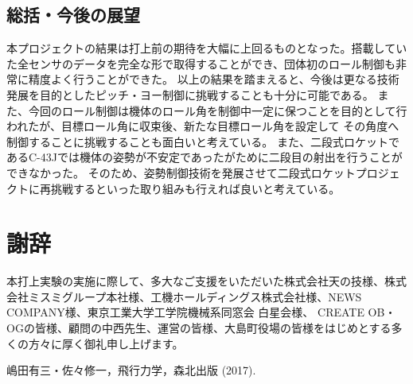 \documentclass[a4paper,11pt,uplatex]{jsarticle}
\begin{document}
\subsection{総括・今後の展望}
本プロジェクトの結果は打上前の期待を大幅に上回るものとなった。搭載していた全センサのデータを完全な形で取得することができ、団体初のロール制御も非常に精度よく行うことができた。
以上の結果を踏まえると、今後は更なる技術発展を目的としたピッチ・ヨー制御に挑戦することも十分に可能である。
また、今回のロール制御は機体のロール角を制御中一定に保つことを目的として行われたが、目標ロール角に収束後、新たな目標ロール角を設定して
その角度へ制御することに挑戦することも面白いと考えている。
また、二段式ロケットであるC-43Jでは機体の姿勢が不安定であったがために二段目の射出を行うことができなかった。
そのため、姿勢制御技術を発展させて二段式ロケットプロジェクトに再挑戦するといった取り組みも行えれば良いと考えている。

\section{謝辞}
本打上実験の実施に際して、多大なご支援をいただいた株式会社天の技様、株式会社ミスミグループ本社様、工機ホールディングス株式会社様、NEWS COMPANY様、東京工業大学工学院機械系同窓会 白星会様、
CREATE OB・OGの皆様、顧問の中西先生、運営の皆様、大島町役場の皆様をはじめとする多くの方々に厚く御礼申し上げます。

\begin{thebibliography}{99}
	 嶋田有三・佐々修一，飛行力学，森北出版 (2017).
\end{thebibliography}
\end{document}
